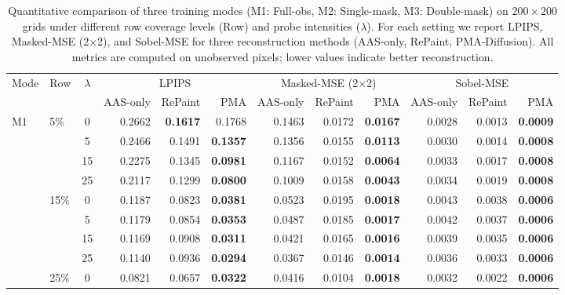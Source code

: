 \documentclass[a4paper,fleqn]{cas-sc}
\numberwithin{equation}{section}
\begin{document}
\begin{table}[width=.99\linewidth,cols=4,pos=b]
\centering
\scriptsize
\setlength{\tabcolsep}{4pt}
\caption{Quantitative comparison of three training modes (M1: Full-obs, M2: Single-mask, M3: Double-mask) on $200{\times}200$ grids under different row coverage levels (Row) and probe intensities ($\lambda$). For each setting we report LPIPS, Masked-MSE (2$\times$2), and Sobel-MSE for three reconstruction methods (AAS-only, RePaint, PMA-Diffusion). All metrics are computed on unobserved pixels; lower values indicate better reconstruction.}
\label{tab:full_result}
\begin{tabular}{llc rrr rrr rrr}
\toprule
\multirow{2}{*}{Mode} & \multirow{2}{*}{Row} & \multirow{2}{*}{$\lambda$} &
\multicolumn{3}{c}{LPIPS} &
\multicolumn{3}{c}{Masked-MSE (2$\times$2)} &
\multicolumn{3}{c}{Sobel-MSE} \\
\cmidrule(lr){4-6}\cmidrule(lr){7-9}\cmidrule(l){10-12}
& & & AAS-only & RePaint & PMA & AAS-only & RePaint & PMA & AAS-only & RePaint & PMA \\
\midrule
\multirow{12}{*}{M1}
& \multirow{4}{*}{5\%}
& 0  & 0.2662 & \textbf{0.1617} & 0.1768 & 0.1463 & 0.0172 & \textbf{0.0167} & 0.0028 & 0.0013 & \textbf{0.0009} \\
& & 5  & 0.2466 & 0.1491 & \textbf{0.1357} & 0.1356 & 0.0155 & \textbf{0.0113} & 0.0030 & 0.0014 & \textbf{0.0008} \\
& & 15 & 0.2275 & 0.1345 & \textbf{0.0981} & 0.1167 & 0.0152 & \textbf{0.0064} & 0.0033 & 0.0017 & \textbf{0.0008} \\
& & 25 & 0.2117 & 0.1299 & \textbf{0.0800} & 0.1009 & 0.0158 & \textbf{0.0043} & 0.0034 & 0.0019 & \textbf{0.0008} \\
\cmidrule(lr){2-12}
& \multirow{4}{*}{15\%}
& 0  & 0.1187 & 0.0823 & \textbf{0.0381} & 0.0523 & 0.0195 & \textbf{0.0018} & 0.0043 & 0.0038 & \textbf{0.0006} \\
& & 5  & 0.1179 & 0.0854 & \textbf{0.0353} & 0.0487 & 0.0185 & \textbf{0.0017} & 0.0042 & 0.0037 & \textbf{0.0006} \\
& & 15 & 0.1169 & 0.0908 & \textbf{0.0311} & 0.0421 & 0.0165 & \textbf{0.0016} & 0.0039 & 0.0035 & \textbf{0.0006} \\
& & 25 & 0.1140 & 0.0936 & \textbf{0.0294} & 0.0367 & 0.0146 & \textbf{0.0014} & 0.0036 & 0.0033 & \textbf{0.0006} \\
\cmidrule(lr){2-12}
& \multirow{4}{*}{25\%}
& 0  & 0.0821 & 0.0657 & \textbf{0.0322} & 0.0416 & 0.0104 & \textbf{0.0018} & 0.0032 & 0.0022 & \textbf{0.0006} \\

\end{tabular}
\end{table}
\end{document}
